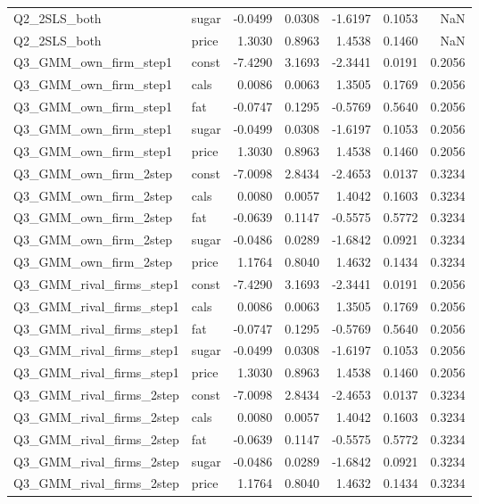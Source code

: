 \begin{longtable}{llrrrrr}
Q2\_2SLS\_both & sugar & -0.0499 & 0.0308 & -1.6197 & 0.1053 & NaN \\
Q2\_2SLS\_both & price & 1.3030 & 0.8963 & 1.4538 & 0.1460 & NaN \\
Q3\_GMM\_own\_firm\_step1 & const & -7.4290 & 3.1693 & -2.3441 & 0.0191 & 0.2056 \\
Q3\_GMM\_own\_firm\_step1 & cals & 0.0086 & 0.0063 & 1.3505 & 0.1769 & 0.2056 \\
Q3\_GMM\_own\_firm\_step1 & fat & -0.0747 & 0.1295 & -0.5769 & 0.5640 & 0.2056 \\
Q3\_GMM\_own\_firm\_step1 & sugar & -0.0499 & 0.0308 & -1.6197 & 0.1053 & 0.2056 \\
Q3\_GMM\_own\_firm\_step1 & price & 1.3030 & 0.8963 & 1.4538 & 0.1460 & 0.2056 \\
Q3\_GMM\_own\_firm\_2step & const & -7.0098 & 2.8434 & -2.4653 & 0.0137 & 0.3234 \\
Q3\_GMM\_own\_firm\_2step & cals & 0.0080 & 0.0057 & 1.4042 & 0.1603 & 0.3234 \\
Q3\_GMM\_own\_firm\_2step & fat & -0.0639 & 0.1147 & -0.5575 & 0.5772 & 0.3234 \\
Q3\_GMM\_own\_firm\_2step & sugar & -0.0486 & 0.0289 & -1.6842 & 0.0921 & 0.3234 \\
Q3\_GMM\_own\_firm\_2step & price & 1.1764 & 0.8040 & 1.4632 & 0.1434 & 0.3234 \\
Q3\_GMM\_rival\_firms\_step1 & const & -7.4290 & 3.1693 & -2.3441 & 0.0191 & 0.2056 \\
Q3\_GMM\_rival\_firms\_step1 & cals & 0.0086 & 0.0063 & 1.3505 & 0.1769 & 0.2056 \\
Q3\_GMM\_rival\_firms\_step1 & fat & -0.0747 & 0.1295 & -0.5769 & 0.5640 & 0.2056 \\
Q3\_GMM\_rival\_firms\_step1 & sugar & -0.0499 & 0.0308 & -1.6197 & 0.1053 & 0.2056 \\
Q3\_GMM\_rival\_firms\_step1 & price & 1.3030 & 0.8963 & 1.4538 & 0.1460 & 0.2056 \\
Q3\_GMM\_rival\_firms\_2step & const & -7.0098 & 2.8434 & -2.4653 & 0.0137 & 0.3234 \\
Q3\_GMM\_rival\_firms\_2step & cals & 0.0080 & 0.0057 & 1.4042 & 0.1603 & 0.3234 \\
Q3\_GMM\_rival\_firms\_2step & fat & -0.0639 & 0.1147 & -0.5575 & 0.5772 & 0.3234 \\
Q3\_GMM\_rival\_firms\_2step & sugar & -0.0486 & 0.0289 & -1.6842 & 0.0921 & 0.3234 \\
Q3\_GMM\_rival\_firms\_2step & price & 1.1764 & 0.8040 & 1.4632 & 0.1434 & 0.3234 \\

\end{longtable}
